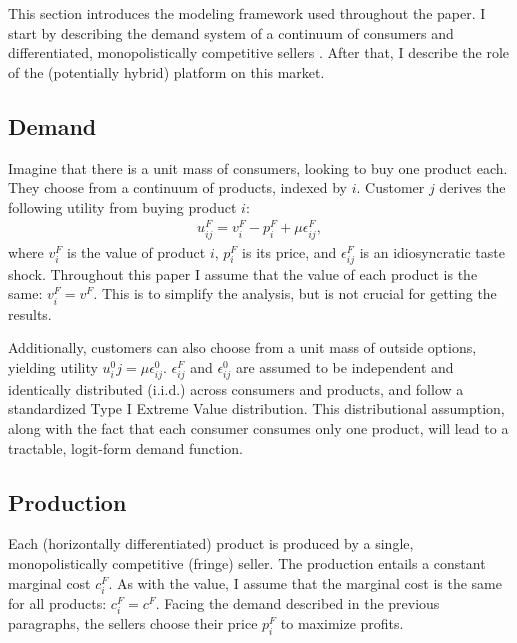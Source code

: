 \documentclass[a4paper]{article}
\begin{document}
This section introduces the modeling framework used throughout the paper.
I start by describing the demand system of a continuum of consumers and differentiated, monopolistically competitive sellers \parencite[]{anderson2021hybrid}.
After that, I describe the role of the (potentially hybrid) platform on this market.

\subsection{Demand}

Imagine that there is a unit mass of consumers, looking to buy one product each.
They choose from a continuum of products, indexed by $i$.
Customer $j$ derives the following utility from buying product $i$:
\begin{align*}
    u^F_{ij} = v^F_i - p^F_i + \mu\epsilon^F_{ij},
\end{align*}
where $v^F_i$ is the value of product $i$, $p^F_i$ is its price, and $\epsilon^F_{ij}$ is an idiosyncratic taste shock.
Throughout this paper I assume that the value of each product is the same: $v^F_i = v^F$.
This is to simplify the analysis, but is not crucial for getting the results.  %

Additionally, customers can also choose from a unit mass of outside options, yielding utility $u^0_ij = \mu\epsilon^0_{ij}$. $\epsilon^F_{ij}$ and $\epsilon^0_{ij}$ are assumed to be independent and identically distributed (i.i.d.) across consumers and products, and follow a standardized Type I Extreme Value distribution. This distributional assumption, along with the fact that each consumer consumes only one product, will lead to a tractable, logit-form demand function.

\subsection{Production}

Each (horizontally differentiated) product is produced by a single, monopolistically competitive (fringe) seller.
The production entails a constant marginal cost $c^F_i$.
As with the value, I assume that the marginal cost is the same for all products: $c^F_i = c^F$.
Facing the demand described in the previous paragraphs, the sellers choose their price $p^F_i$ to maximize profits.
\end{document}
